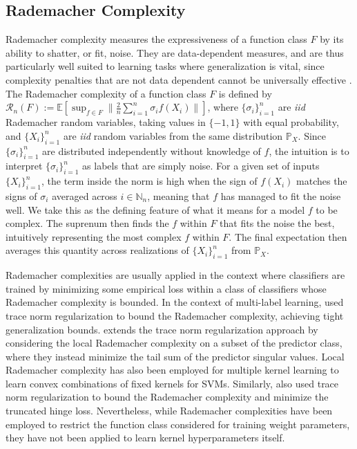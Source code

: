 \documentclass[runningheads, envcountsame, a4paper]{llncs}
\begin{document}
		\subsection{Rademacher Complexity}
	
			Rademacher complexity \citep{bartlett2002rademacher} measures the expressiveness of a function class $F$ by its ability to shatter, or fit, noise. They are data-dependent measures, and are thus particularly well suited to learning tasks where generalization is vital, since complexity penalties that are not data dependent cannot be universally effective \citep{kearns1997experimental}. The Rademacher complexity \citep[Definition 2]{bartlett2002rademacher} of a function class $F$ is defined by $\mathcal{R}_{n}(F) := \mathbb{E}[\sup_{f \in F} \| \frac{2}{n} \sum_{i = 1}^{n} \sigma_{i} f(X_{i}) \|]$, where $\{\sigma_{i}\}_{i = 1}^{n}$ are \textit{iid} Rademacher random variables, taking values in $\{-1, 1\}$ with equal probability, and $\{X_{i}\}_{i = 1}^{n}$ are \textit{iid} random variables from the same distribution $\mathbb{P}_{X}$. Since $\{\sigma_{i}\}_{i = 1}^{n}$ are distributed independently without knowledge of $f$, the intuition is to interpret $\{\sigma_{i}\}_{i = 1}^{n}$ as labels that are simply noise. For a given set of inputs $\{X_{i}\}_{i = 1}^{n}$, the term inside the norm is high when the sign of $f(X_{i})$ matches the signs of $\sigma_{i}$ averaged across $i \in \mathbb{N}_{n}$, meaning that $f$ has managed to fit the noise well. We take this as the defining feature of what it means for a model $f$ to be complex. The suprenum then finds the $f$ within $F$ that fits the noise the best, intuitively representing the most complex $f$ within $F$. The final expectation then averages this quantity across realizations of $\{X_{i}\}_{i = 1}^{n}$ from $\mathbb{P}_{X}$.
	
			Rademacher complexities are usually applied in the context where classifiers are trained by minimizing some empirical loss within a class of classifiers whose Rademacher complexity is bounded. In the context of multi-label learning, \cite{yu2014large} used trace norm regularization to bound the Rademacher complexity, achieving tight generalization bounds. \cite{xu2016local} extends the trace norm regularization approach by considering the local Rademacher complexity on a subset of the predictor class, where they instead minimize the tail sum of the predictor singular values. Local Rademacher complexity has also been employed for multiple kernel learning \citep{kloft2011local, cortes2013learning} to learn convex combinations of fixed kernels for \glspl{SVM}. Similarly, \cite{pontil2013excess} also used trace norm regularization to bound the Rademacher complexity and minimize the truncated hinge loss. Nevertheless, while Rademacher complexities have been employed to restrict the function class considered for training weight parameters, they have not been applied to learn kernel hyperparameters itself.
\end{document}
